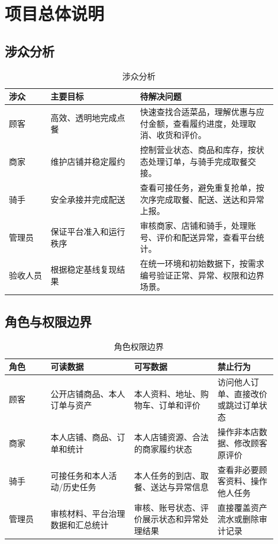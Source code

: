 \section{项目总体说明}

\subsection{涉众分析}

\begin{longtable}{|L{0.14\linewidth}|L{0.30\linewidth}|L{0.46\linewidth}|}
\caption{涉众分析}\label{tab:stakeholders}\\ \hline
\textbf{涉众} & \textbf{主要目标} & \textbf{待解决问题} \\ \hline
顾客 & 高效、透明地完成点餐 & 快速查找合适菜品，理解优惠与应付金额，查看履约进度，处理取消、收货和评价。 \\ \hline
商家 & 维护店铺并稳定履约 & 控制营业状态、商品和库存，按状态处理订单，与骑手完成取餐交接。 \\ \hline
骑手 & 安全承接并完成配送 & 查看可接任务，避免重复抢单，按次序完成取餐、配送、送达和异常上报。 \\ \hline
管理员 & 保证平台准入和运行秩序 & 审核商家、店铺和骑手，处理账号、评价和配送异常，查看平台统计。 \\ \hline
验收人员 & 根据稳定基线复现结果 & 在统一环境和初始数据下，按需求编号验证正常、异常、权限和边界场景。 \\ \hline
\end{longtable}

\subsection{角色与权限边界}

\begin{longtable}{|L{0.14\linewidth}|L{0.28\linewidth}|L{0.28\linewidth}|L{0.20\linewidth}|}
\caption{角色权限边界}\label{tab:role-permission}\\ \hline
\textbf{角色} & \textbf{可读数据} & \textbf{可写数据} & \textbf{禁止行为} \\ \hline
顾客 & 公开店铺商品、本人订单与资产 & 本人资料、地址、购物车、订单和评价 & 访问他人订单、直接改价或跳过订单状态 \\ \hline
商家 & 本人店铺、商品、订单和统计 & 本人店铺资源、合法的商家履约状态 & 操作非本店数据、修改顾客原评价 \\ \hline
骑手 & 可接任务和本人活动/历史任务 & 本人任务的到店、取餐、送达与异常信息 & 查看非必要顾客资料、操作他人任务 \\ \hline
管理员 & 审核材料、平台治理数据和汇总统计 & 审核、账号状态、评价展示状态和异常处理结果 & 直接覆盖资产流水或删除审计记录 \\ \hline
\end{longtable}

